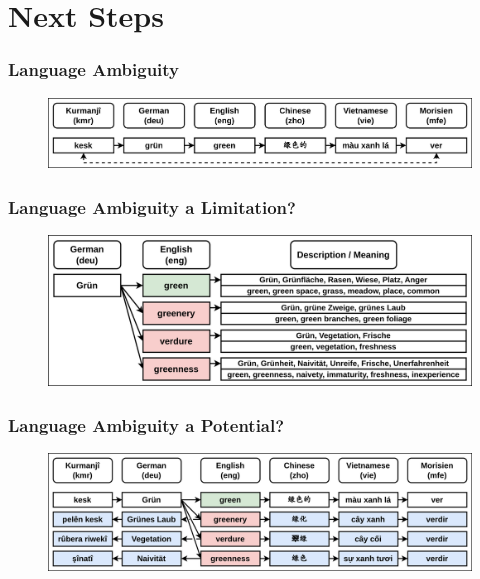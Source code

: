 \documentclass[aspectratio=169]{beamer}
\begin{document}
\section{Next Steps}


\begin{frame}[fragile]
	\frametitle{Language Ambiguity}
    \begin{figure}
        \centering
        \includegraphics[width=1.0\textwidth]{images/CRAMT-Tool-WordAlignmentExample.png} 
    \end{figure}
\end{frame}

\begin{frame}[fragile]
	\frametitle{Language Ambiguity a Limitation?}
    \begin{figure}
        \centering
        \includegraphics[width=1.0\textwidth]{images/CRAMT-Tool-WordAlignmentLimitation.png} 
    \end{figure}
\end{frame}

\begin{frame}[fragile]
	\frametitle{Language Ambiguity a Potential?}
    \begin{figure}
        \centering
        \includegraphics[width=1.0\textwidth]{images/CRAMT-Tool-WordAlignmentLimitationExample.png} 
    \end{figure}
\end{frame}
\end{document}
